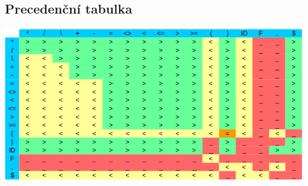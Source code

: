 \documentclass[11pt]{article}
\begin{document}
	\newpage
	\subsection{Precedenční tabulka}
	\begin{center}
		\includegraphics[scale = 0.65]{precendenc_table.png}\\
	\end{center}
	\vfill
	
\end{document}

